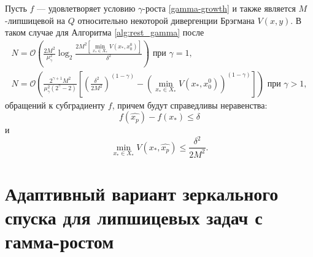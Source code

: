     \begin{remark}
        Пусть $f$ --- удовлетворяет условию $\gamma$-роста \eqref{gamma-growth} и также является $M$-липшицевой на $Q$ относительно некоторой дивергенции Брэгмана $V(x, y)$. В таком случае для Алгоритма \ref{alg:rest_gamma} после
        \begin{equation}
            \begin{aligned}
               N = \mathcal{O}\left(\frac{2 M^2}{\mu_{\gamma}^2} \log_2{\frac{2 M^2 \left[\min\limits_{x_* \in X_*}{V(x_*, x_0^0)}\right]}{\delta^2}}\right) \text{ при } \gamma = 1, \\
               N = \mathcal{O}\left(\frac{2^{\gamma + 1} M^2}{\mu_{\gamma}^2 (2^{\gamma} - 2)} \left[\left(\frac{\delta^2}{2 M^2}\right)^{(1 - \gamma)} - \left(\min\limits_{x_* \in X_*}{V(x_*, x_0^0)}\right)^{(1 - \gamma)}\right]\right) \text{ при } \gamma > 1,
            \end{aligned}
        \end{equation}
        обращений к субградиенту $f$, причем будут справедливы неравенства:
        \begin{equation}
           f(\widehat{x_p}) - f(x_*)  \leq \delta 
        \end{equation}
        и
        \begin{equation}
           \min\limits_{x_* \in X_*}{V(x_*, \widehat{x_p})} \leq \frac{\delta^2}{2 M^2}.
        \end{equation}
    \end{remark}

\section{Адаптивный вариант зеркального спуска для липшицевых задач с гамма-ростом}\label{sec:ch3/sect4}

